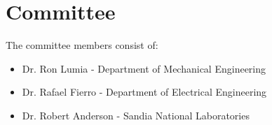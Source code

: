 \documentclass[12pt]{article}
\begin{document}
\section{Committee}
\label{ch:committee}

The committee members consist of:

\begin{itemize}
\item Dr. Ron Lumia - Department of Mechanical Engineering 
\item Dr. Rafael Fierro - Department of Electrical Engineering
\item Dr. Robert Anderson - Sandia National Laboratories 
\end{itemize}

\pagebreak



\end{document}
